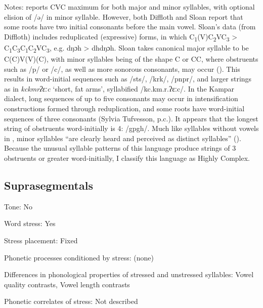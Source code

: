 {\begin{appendixdesc}
\item[Notes:] \citet{Philips2007} reports CVC maximum for both major and minor syllables, with optional elision of /ə/ in minor syllable. However, both Diffloth and Sloan report that some roots have two initial consonants before the main vowel. Sloan’s data (from Diffloth) includes reduplicated (expressive) forms, in which C\textsubscript{1}(V)C\textsubscript{2}VC\textsubscript{3} > C\textsubscript{1}C\textsubscript{3}C\textsubscript{1}C\textsubscript{2}VC\textsubscript{3}, e.g. dŋɔh > dhdŋɔh. Sloan takes canonical major syllable to be C(C)V(V)(C), with minor syllables being of the shape C or CC, where obstruents such as /p/ or /c/, as well as more sonorous consonants, may occur (\citeyear[320--321]{Sloan1988}). This results in word-initial sequences such as /sts/, /krk/, /pnpr/, and larger strings as in \textit{kckmrʔɛːc} ‘short, fat arms’, syllabified /kc.km.r.ʔɛːc/. In the Kampar dialect, long sequences of up to five consonants may occur in intensification constructions formed through reduplication, and some roots have word-initial sequences of three consonants (Sylvia Tufvesson, p.c.). It appears that the longest string of obstruents word-initially is 4: /gpgh/. Much like syllables without vowels in ,  minor syllables “are clearly heard and perceived as distinct syllables” (\citeyear[320]{Sloan1988}). Because the unusual syllable patterns of this language produce strings of 3 obstruents or greater word-initially, I classify this language as Highly Complex.
\end{appendixdesc}
\subsection*{Suprasegmentals}
\begin{appendixdesc}
\item[Tone:] No

\item[Word stress:] Yes

\item[Stress placement:] Fixed

\item[Phonetic processes conditioned by stress:] (none)

\item[Differences in phonological properties of stressed and unstressed syllables:] Vowel quality contrasts, Vowel length contrasts

\item[Phonetic correlates of stress:] Not described
\end{appendixdesc}
}
